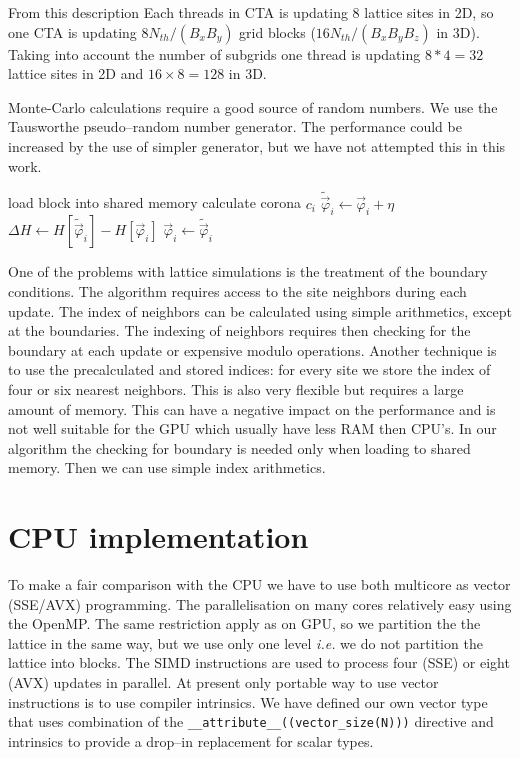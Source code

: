 \documentclass[a4paper]{llncs}
\newcommand{\vphi}{\vec{\varphi}}
\begin{document}
From this description Each threads in CTA is updating 8
lattice sites in 2D, so one CTA is updating $8 N_{th}/(B_x B_y)$ grid
blocks ($16 N_{th}/(B_x B_y B_z)$ in 3D). Taking into account the number of
subgrids one thread is updating $8*4=32$ lattice sites in 2D and
$16\times 8=128$ in 3D.

Monte-Carlo calculations require a good source of random numbers. We
use the Tausworthe pseudo--random number
generator\cite{howes_thomas07}. The performance could be increased by
the use of simpler generator, but we have not attempted this in this
work.

\begin{algorithm}
\begin{algorithmic}[1]
\State load block  into shared memory
\State calculate corona $c_i$ 
\State $\widetilde{\vphi}_i \gets \vphi_i+\eta$
\State $\Delta H \gets H[\widetilde{\vphi}_i]-H[\vphi_i]$
\State $\vphi_i \gets \widetilde{\vphi}_i$
\EndIf
\EndFor
\EndFor 
{}
\EndFor
\EndFor
\EndFor
\EndFor
\end{algorithmic}
\caption{\label{alg:gpu}}
\end{algorithm}


One of the problems with lattice simulations is the treatment of the
boundary conditions. The algorithm requires access to the site
neighbors during each update. The index of neighbors can be calculated
using simple arithmetics, except at the boundaries. The indexing of
neighbors requires then checking for the boundary at each update or
expensive modulo operations. Another technique is to use the
precalculated and stored indices: for every site we store the index of
four or six nearest neighbors. This is also very flexible but
requires a large amount of memory. This can have a negative impact on
the performance and is not well suitable for the GPU which usually
have less RAM then CPU's. In our algorithm the checking for boundary
is needed only when loading to shared memory. Then we can use simple
index arithmetics.




\section{CPU implementation}
To make a fair comparison with the CPU we have to use both multicore
as vector (SSE/AVX) programming.  The parallelisation on many cores
relatively easy using the OpenMP. The same restriction apply as on
GPU, so we partition the the lattice in the same way, but we use only
one level {\em i.e.} we do not partition the lattice into blocks.  The
SIMD instructions are used to process four (SSE) or eight (AVX)
updates in parallel.  At present only portable way to use vector
instructions is to use compiler intrinsics\cite{intr}. We have defined
our own vector type that uses combination of the 
 \lstinline!__attribute__((vector_size(N)))!  directive and intrinsics
to provide a drop--in replacement for scalar types.
\end{document}
